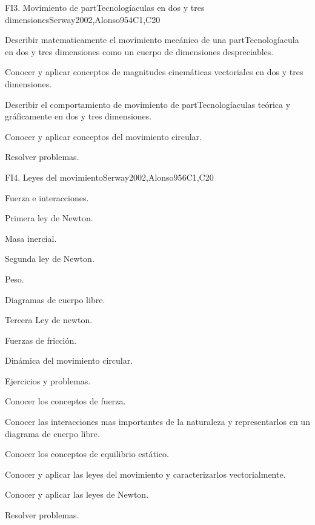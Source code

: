 \begin{syllabus}
\begin{unit}{FI3. Movimiento de partTecnologíaculas en dos y tres dimensiones}{}{Serway2002,Alonso95}{4}{C1,C20}
   \begin{learningoutcomes}
      \item Describir matematicamente el movimiento mecánico de una partTecnologíacula en dos y tres dimensiones como un cuerpo de dimensiones despreciables.
      \item Conocer y aplicar conceptos de magnitudes cinemáticas vectoriales en dos y tres dimensiones.
      \item Describir el comportamiento de movimiento de partTecnologíaculas teórica y gráficamente en dos y tres dimensiones.
      \item Conocer y aplicar conceptos del movimiento circular.
      \item Resolver problemas.
   \end{learningoutcomes}
\end{unit}

\begin{unit}{FI4. Leyes del movimiento}{}{Serway2002,Alonso95}{6}{C1,C20}
\begin{topics}
      \item Fuerza e interacciones.
      \item Primera ley de Newton.
      \item Masa inercial.
      \item Segunda ley de Newton.
      \item Peso.
      \item Diagramas de cuerpo libre.
      \item Tercera Ley de newton.
      \item Fuerzas de fricción.
      \item Dinámica del movimiento circular.
      \item Ejercicios y problemas.
   \end{topics}

   \begin{learningoutcomes}
      \item Conocer los conceptos de fuerza.
      \item Conocer las interacciones mas importantes de la naturaleza y representarlos en un diagrama de cuerpo libre.
      \item Conocer los conceptos de equilibrio estático.
      \item Conocer y aplicar las leyes del movimiento y caracterizarlos vectorialmente.
      \item Conocer y aplicar las leyes de Newton.
      \item Resolver problemas.
   \end{learningoutcomes}
\end{unit}


\end{syllabus}
